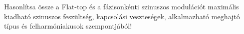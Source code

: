 \begin{example}

Hasonlítsa össze a Flat-top és a fázisonkénti szinuszos modulációt maximális kiadható szinuszos feszültség, kapcsolási veszteségek, alkalmazható meghajtó típus és felharmóniakusok szempontjából!

\tcbline
\vspace{1mm}

\solution

\end{example}